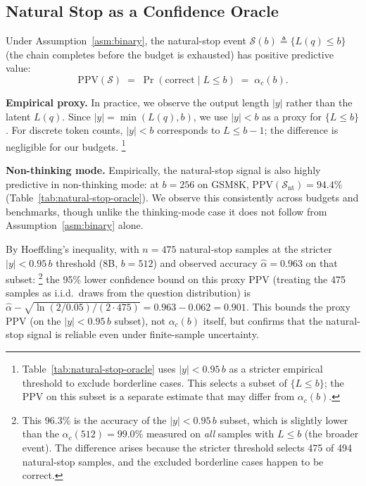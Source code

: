 \subsection{Natural Stop as a Confidence Oracle}
\label{sec:theory:oracle}

\begin{proposition}
\label{prop:oracle}
Under Assumption~\ref{asm:binary}, the natural-stop event
$\mathcal{S}(b) \triangleq \{L(q) \le b\}$
(the chain completes before the budget is exhausted) has positive predictive
value:
\begin{equation}
  \mathrm{PPV}(\mathcal{S}) \;=\;
  \Pr(\mathrm{correct} \mid L \le b)
  \;=\; \alpha_c(b).
  \label{eq:ppv}
\end{equation}
\end{proposition}

\noindent
\textbf{Empirical proxy.}
In practice, we observe the output length $|y|$ rather than the
latent $L(q)$.
Since $|y| = \min(L(q), b)$, we use $|y| < b$ as a proxy for
$\{L \le b\}$.
For discrete token counts, $|y| < b$ corresponds to $L \le b - 1$;
the difference is negligible for our budgets.%
\footnote{Table~\ref{tab:natural-stop-oracle} uses $|y| < 0.95\,b$
as a stricter empirical threshold to exclude borderline cases.
This selects a subset of $\{L \le b\}$; the PPV on this subset
is a separate estimate that may differ from $\alpha_c(b)$.}

\noindent
\textbf{Non-thinking mode.}
Empirically, the natural-stop signal is also highly predictive in
non-thinking mode:
at $b{=}256$ on GSM8K, $\mathrm{PPV}(\mathcal{S}_{\mathrm{nt}}) = 94.4\%$
(Table~\ref{tab:natural-stop-oracle}).
We observe this consistently across budgets and benchmarks, though
unlike the thinking-mode case it does not follow from
Assumption~\ref{asm:binary} alone.

\noindent
By Hoeffding's inequality, with $n{=}475$ natural-stop samples
at the stricter $|y| < 0.95\,b$ threshold (8B, $b{=}512$)
and observed accuracy $\hat{\alpha} = 0.963$ on that subset:%
\footnote{This 96.3\% is the accuracy of the $|y| < 0.95\,b$ subset,
which is slightly lower than the $\alpha_c(512) = 99.0\%$ measured
on \emph{all} samples with $L \le b$ (the broader event).
The difference arises because the stricter threshold selects 475 of 494
natural-stop samples, and the excluded borderline cases happen to be
correct.}
the 95\% lower confidence bound on this proxy PPV
(treating the 475 samples as i.i.d.\ draws from the question
distribution) is
$\hat{\alpha} - \sqrt{\ln(2/0.05)/(2 \cdot 475)} = 0.963 - 0.062 = 0.901$.
This bounds the proxy PPV (on the $|y|<0.95\,b$ subset), not $\alpha_c(b)$
itself, but confirms that the natural-stop signal is reliable even under
finite-sample uncertainty.

